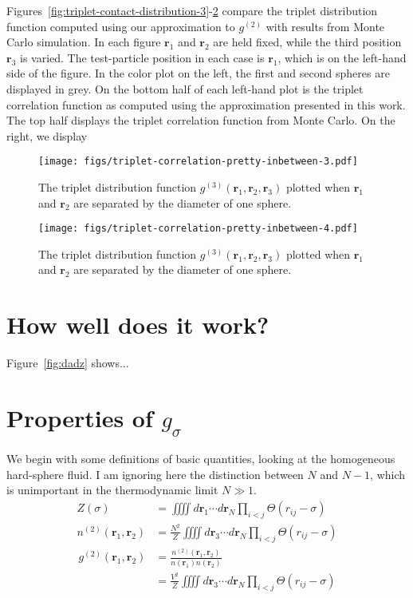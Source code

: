 \documentclass[letterpaper,twocolumn,amsmath,amssymb,pre,aps,10pt]{revtex4-1}
\newcommand{\rr}{\textbf{r}}
\begin{document}
Figures~\ref{fig:triplet-contact-distribution-3}-\ref{fig:triplet-inbetween-distribution-4}
compare the triplet distribution function computed using our
approximation to $g^{(2)}$ with results from Monte Carlo simulation.
In each figure $\rr_1$ and $\rr_2$ are held fixed, while the third
position $\rr_3$ is varied.  The test-particle position in each case
is $\rr_1$, which is on the left-hand side of the figure.  In the
color plot on the left, the first and second spheres are displayed in
grey.  On the bottom half of each left-hand plot is the triplet
correlation function as computed using the approximation presented in
this work.  The top half displays the triplet correlation function
from Monte Carlo.  On the right, we display 

\begin{figure}
  \texttt{[image: figs/triplet-correlation-pretty-inbetween-3.pdf]}
  \caption{The triplet distribution function
    $g^{(3)}(\rr_1,\rr_2,\rr_3)$ plotted when $\rr_1$ and $\rr_2$ are
    separated by the diameter of one sphere.}\label{fig:triplet-inbetween-distribution-3}
\end{figure}
\begin{figure}
  \texttt{[image: figs/triplet-correlation-pretty-inbetween-4.pdf]}
  \caption{The triplet distribution function
    $g^{(3)}(\rr_1,\rr_2,\rr_3)$ plotted when $\rr_1$ and $\rr_2$ are
    separated by the diameter of one sphere.}\label{fig:triplet-inbetween-distribution-4}
\end{figure}


\section{How well does it work?}
Figure~\ref{fig:dadz} shows...

\appendix

\section{Properties of $g_\sigma$}
We begin with some definitions of basic quantities, looking at the
homogeneous hard-sphere fluid.  I am ignoring here the distinction
between $N$ and $N-1$, which is unimportant in the thermodynamic limit
$N\gg 1$.
\begin{align}
  Z(\sigma) &= \iiiint d\rr_1\cdots d\rr_N \prod_{i<j} \Theta(r_{ij}-\sigma)
  \\
  n^{(2)}(\rr_1,\rr_2) &= \frac{N^2}{Z}\iiiint d\rr_3\cdots d\rr_N \prod_{i<j} \Theta(r_{ij}-\sigma)
\end{align}
\begin{align}
  g^{(2)}(\rr_1,\rr_2) &=
  \frac{n^{(2)}(\rr_1,\rr_2)}{n(\rr_1)n(\rr_2)}
  \\
  &= \frac{V^2}{Z}\iiiint d\rr_3\cdots d\rr_N \prod_{i<j}
  \Theta(r_{ij}-\sigma)
  \label{eq:g2-integral-defn}
\end{align}
\end{document}
